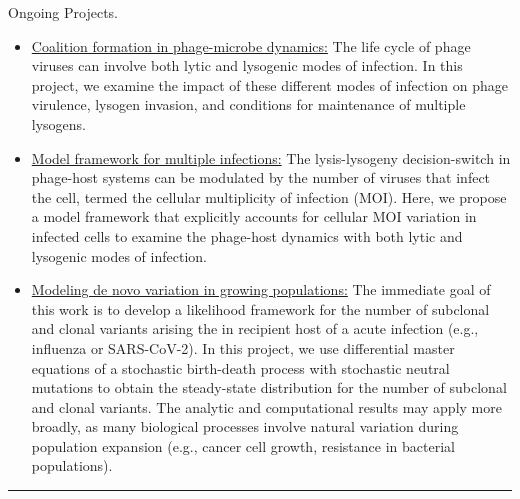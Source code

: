 \documentclass[a4paper,10pt]{article}
\newlength{\cvcolumngapwidth}
\newlength{\cvleftcolumnwidth}
\newlength{\cvrightcolumnwidth}
\newcommand{\cvsectionstyle}[1]{{\normalsize\cvsectionfont\textcolor{cvsectioncolor}{#1}}}
\newcommand{\cvtitlestyle}[1]{{\large\cvtitlefont\textcolor{cvtitlecolor}{#1}}}
\newcommand{\cvdurationstyle}[1]{{\small\cvdurationfont\textcolor{cvdurationcolor}{#1}}}
\newlength{\cvafteritemskipamount}
\newlength{\cvaftersectionskipamount}
\newlength{\cvbetweensectionandheadingextraskipamount}
\newlength{\cvaftertitleskipamount}
\newlength{\cvparskip}
\newcommand{\cvsection}[1]{
            \begin{minipage}[t]{\cvleftcolumnwidth}
                \raggedleft\cvsectionstyle{#1}
            \end{minipage}%
            \hspace{\cvcolumngapwidth}%
            \begin{minipage}[t]{\cvrightcolumnwidth}
                \textcolor{cvrulecolor}{\rule{\cvrightcolumnwidth}{0.3mm}}
            \end{minipage}
        
            \vspace{\cvaftersectionskipamount}
        }
\newcommand{\cvitem}[2]{
            \begin{minipage}[t]{\cvleftcolumnwidth}
                \raggedleft #1
            \end{minipage}%
            \hspace{\cvcolumngapwidth}%
            \begin{minipage}[t]{\cvrightcolumnwidth}
                \setlength{\parskip}{\cvparskip} #2
            \end{minipage}
        
            \vspace{\cvafteritemskipamount}
        }
\newcommand{\cvtitle}[1]{
            \cvtitlestyle{#1}
        
            \vspace{\cvaftertitleskipamount}
            \vspace{-\cvparskip}
        }
\begin{document}
                \cvitem{
            \cvdurationstyle{Ongoing Projects.}
        }{
            \begin{itemize}[leftmargin=*]
                	\item {\underline{Coalition formation in phage-microbe dynamics:}} The life cycle of phage viruses can involve both lytic and lysogenic modes of infection. In this project, we examine the impact of these different modes of infection on phage virulence, lysogen invasion, and conditions for maintenance of multiple lysogens.
        	        \item {\underline{Model framework for multiple infections:}} The lysis-lysogeny decision-switch in phage-host systems can be modulated by the number of viruses that infect the cell, termed the cellular multiplicity of infection (MOI). Here, we propose a model framework that explicitly accounts for cellular MOI variation in infected cells to examine the phage-host dynamics with both lytic and lysogenic modes of infection.
		\item {\underline{Modeling de novo variation in growing populations:}} The immediate goal of this work is to develop a likelihood framework for the number of subclonal and clonal variants arising the in recipient host of a acute infection (e.g., influenza or SARS-CoV-2). In this project, we use differential master equations of a stochastic birth-death process with stochastic neutral mutations to obtain the steady-state distribution for the number of subclonal and clonal variants. The analytic and computational results may apply more broadly, as many biological processes involve natural variation during population expansion (e.g., cancer cell growth, resistance in bacterial populations).
            \end{itemize}
        }
        
        \newpage
        
        \cvsection{PRESENTATIONS}
        \vspace{\cvbetweensectionandheadingextraskipamount}
        
\end{document}
